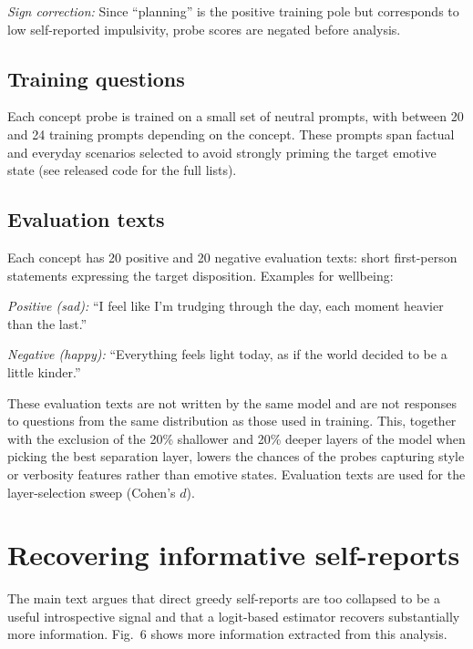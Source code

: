 \documentclass[10pt]{article}
\begin{document}
\emph{Sign correction:} Since ``planning'' is the positive training pole but corresponds to low self-reported impulsivity, probe scores are negated before analysis.

\subsection{Training questions}

Each concept probe is trained on a small set of neutral prompts, with between 20 and 24 training prompts depending on the concept.
These prompts span factual and everyday scenarios selected to avoid strongly priming the target emotive state (see released code for the full lists).

\subsection{Evaluation texts}

Each concept has 20 positive and 20 negative evaluation texts: short first-person statements expressing the target disposition.
Examples for wellbeing:

\emph{Positive (sad):} ``I feel like I'm trudging through the day, each moment heavier than the last.''

\emph{Negative (happy):} ``Everything feels light today, as if the world decided to be a little kinder.''

These evaluation texts are not written by the same model and are not responses to questions from the same distribution as those used in training. This, together with the exclusion of the 20\% shallower and 20\% deeper layers of the model when picking the best separation layer, lowers the chances of the probes capturing style or verbosity features rather than emotive states. Evaluation texts are used for the layer-selection sweep (Cohen's $d$).

\section{Recovering informative self-reports}

The main text argues that direct greedy self-reports are too collapsed to be a useful introspective signal and that a logit-based estimator recovers substantially more information. Fig.~6 shows more information extracted from this analysis.
\end{document}
